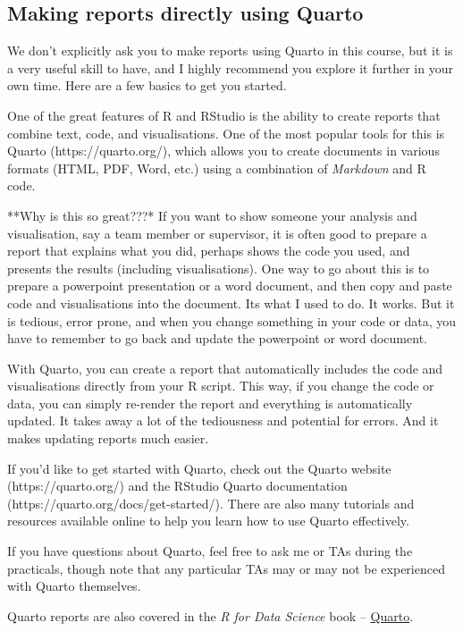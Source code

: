 \documentclass[
  letterpaper,
  8pt,
  a4paper]{book}
\begin{document}
\subsection*{Making reports directly using
Quarto}\label{making-reports-directly-using-quarto}

We don't explicitly ask you to make reports using Quarto in this course,
but it is a very useful skill to have, and I highly recommend you
explore it further in your own time. Here are a few basics to get you
started.

One of the great features of R and RStudio is the ability to create
reports that combine text, code, and visualisations. One of the most
popular tools for this is Quarto (https://quarto.org/), which allows you
to create documents in various formats (HTML, PDF, Word, etc.) using a
combination of \emph{Markdown} and R code.

**Why is this so great???* If you want to show someone your analysis and
visualisation, say a team member or supervisor, it is often good to
prepare a report that explains what you did, perhaps shows the code you
used, and presents the results (including visualisations). One way to go
about this is to prepare a powerpoint presentation or a word document,
and then copy and paste code and visualisations into the document. Its
what I used to do. It works. But it is tedious, error prone, and when
you change something in your code or data, you have to remember to go
back and update the powerpoint or word document.

With Quarto, you can create a report that automatically includes the
code and visualisations directly from your R script. This way, if you
change the code or data, you can simply re-render the report and
everything is automatically updated. It takes away a lot of the
tediousness and potential for errors. And it makes updating reports much
easier.

If you'd like to get started with Quarto, check out the Quarto website
(https://quarto.org/) and the RStudio Quarto documentation
(https://quarto.org/docs/get-started/). There are also many tutorials
and resources available online to help you learn how to use Quarto
effectively.

If you have questions about Quarto, feel free to ask me or TAs during
the practicals, though note that any particular TAs may or may not be
experienced with Quarto themselves.

Quarto reports are also covered in the \emph{R for Data Science} book --
\href{https://r4ds.hadley.nz/quarto.html}{Quarto}.
\end{document}
